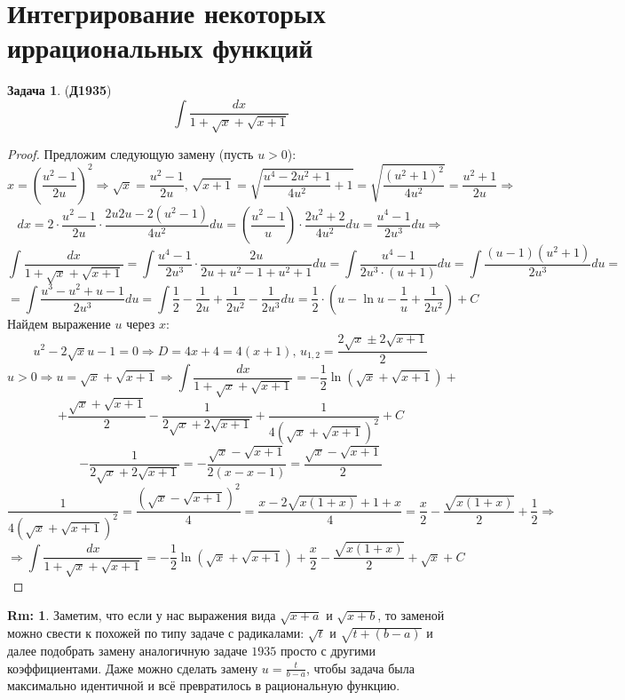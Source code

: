 \documentclass[12pt]{article}
\newcommand{\RN}[1]{%
	\textup{\uppercase\expandafter{\romannumeral#1}}%
}
\theoremstyle{definition}
\newtheorem{rem}{Rm:}
\newtheorem{problem}{Задача}
\DeclareMathOperator{\dint}{\displaystyle\int}
\begin{document}
\lhead{Математический анализ - \RN{2}}
\section*{Интегрирование некоторых иррациональных функций}

\begin{problem}(\textbf{Д1935})
	$$
		\dint \dfrac{dx}{1 + \sqrt{x} + \sqrt{x+1}}
	$$
\end{problem}
\begin{proof}
	Предложим следующую замену (пусть $u > 0$):
	$$
		x = \left(\dfrac{u^2 - 1}{2u}\right)^2 \Rightarrow \sqrt{x} = \dfrac{u^2 - 1}{2u}, \, \sqrt{x+1} = \sqrt{\dfrac{u^4 - 2u^2 + 1}{4u^2} + 1 } = \sqrt{\dfrac{(u^2 + 1)^2}{4u^2}} = \dfrac{u^2 + 1}{2u} \Rightarrow
	$$
	$$
		dx = 2{\cdot}\dfrac{u^2 -1}{2u}{\cdot}\dfrac{2u2u - 2(u^2 -1)}{4u^2}du= \left(\dfrac{u^2 -1}{u}\right){\cdot}\dfrac{2u^2 +2}{4u^2}du = \dfrac{u^4 -1}{2u^3}du \Rightarrow
	$$
	$$
		\dint \dfrac{dx}{1 + \sqrt{x} + \sqrt{x+1}} = \dint \dfrac{u^4 -1 }{2u^3}{\cdot}\dfrac{2u}{2u + u^2 -1  + u^2 + 1}du = \dint \dfrac{u^4 - 1}{2u^3{\cdot}(u + 1)}du = \dint \dfrac{(u-1)(u^2 +1)}{2u^3}du =
	$$
	$$
		=  \dint\dfrac{u^3 - u^2 + u -1}{2u^3}du = \dint \dfrac{1}{2} - \dfrac{1}{2u} + \dfrac{1}{2u^2} - \dfrac{1}{2u^3}du = \dfrac{1}{2}{\cdot}\left(u - \ln{u} - \dfrac{1}{u} + \dfrac{1}{2u^2}\right) + C
	$$
	Найдем выражение $u$ через $x$:
	$$
		u^2 - 2\sqrt{x}u - 1 = 0 \Rightarrow D = 4x + 4 =4(x+ 1),\, u_{1,2} = \dfrac{2\sqrt{x} \pm 2\sqrt{x + 1}}{2}
	$$
	$$
		u > 0 \Rightarrow u = \sqrt{x} + \sqrt{x+ 1} \Rightarrow \dint \dfrac{dx}{1 + \sqrt{x} + \sqrt{x+1}}  = -\dfrac{1}{2}\ln{( \sqrt{x} + \sqrt{x+ 1})} +
	$$
	$$
		 + \dfrac{ \sqrt{x} + \sqrt{x+ 1}}{2} - \dfrac{1}{2 \sqrt{x} + 2\sqrt{x+ 1}} + \dfrac{1}{4\left( \sqrt{x} + \sqrt{x+ 1}\right)^2} + C
	$$
	$$
		- \dfrac{1}{2 \sqrt{x} + 2\sqrt{x+ 1}}= - \dfrac{\sqrt{x} - \sqrt{x + 1}}{2(x - x - 1)} = \dfrac{\sqrt{x} - \sqrt{x+1}}{2}
	$$
	$$
		\dfrac{1}{4\left( \sqrt{x} + \sqrt{x+ 1}\right)^2}  = \dfrac{(\sqrt{x} - \sqrt{x+1})^2}{4} = \dfrac{x -2\sqrt{x(1 +x)} + 1 + x}{4} = \dfrac{x}{2} - \dfrac{\sqrt{x(1+x)}}{2} + \dfrac{1}{2} \Rightarrow
	$$
	$$
		\Rightarrow \dint \dfrac{dx}{1 + \sqrt{x} + \sqrt{x+1}} = -\dfrac{1}{2}\ln{( \sqrt{x} + \sqrt{x+ 1})}  + \dfrac{x}{2} - \dfrac{\sqrt{x(1+x)}}{2} + \sqrt{x} + C
	$$
\end{proof}

\begin{rem}
	Заметим, что если у нас выражения вида $\sqrt{x + a}$ и $\sqrt{x + b}$, то заменой можно свести к похожей по типу задаче с радикалами: $\sqrt{t}$ и $\sqrt{t + (b-a)}$ и далее подобрать замену аналогичную задаче $1935$ просто с другими коэффициентами. Даже можно сделать замену $u = \tfrac{t}{b-a}$, чтобы задача была максимально идентичной и всё превратилось в рациональную функцию.
\end{rem}
\end{document}
